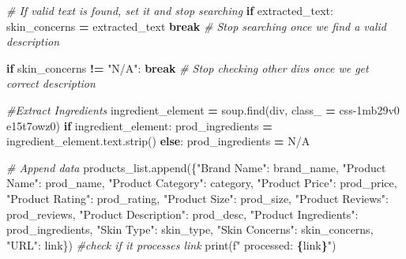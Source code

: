 \documentclass[
]{article}
\newenvironment{Shaded}{\begin{snugshade}}{\end{snugshade}}
\newcommand{\BuiltInTok}[1]{#1}
\newcommand{\CommentTok}[1]{\textcolor[rgb]{0.56,0.35,0.01}{\textit{#1}}}
\newcommand{\ControlFlowTok}[1]{\textcolor[rgb]{0.13,0.29,0.53}{\textbf{#1}}}
\newcommand{\NormalTok}[1]{#1}
\newcommand{\OperatorTok}[1]{\textcolor[rgb]{0.81,0.36,0.00}{\textbf{#1}}}
\newcommand{\SpecialCharTok}[1]{\textcolor[rgb]{0.81,0.36,0.00}{\textbf{#1}}}
\newcommand{\SpecialStringTok}[1]{\textcolor[rgb]{0.31,0.60,0.02}{#1}}
\newcommand{\StringTok}[1]{\textcolor[rgb]{0.31,0.60,0.02}{#1}}
\begin{document}
\begin{Shaded}
\begin{Highlighting}[]
                \CommentTok{\# If valid text is found, set it and stop searching}
                \ControlFlowTok{if}\NormalTok{ extracted\_text:}
\NormalTok{                  skin\_concerns }\OperatorTok{=}\NormalTok{ extracted\_text}
                  \ControlFlowTok{break} \CommentTok{\# Stop searching once we find a valid description}

            \ControlFlowTok{if}\NormalTok{ skin\_concerns }\OperatorTok{!=} \StringTok{"N/A"}\NormalTok{:}
              \ControlFlowTok{break}  \CommentTok{\# Stop checking other divs once we get correct description}
            
        \CommentTok{\#Extract Ingredients}
\NormalTok{        ingredient\_element }\OperatorTok{=}\NormalTok{ soup.find(}\StringTok{\textquotesingle{}div\textquotesingle{}}\NormalTok{, }
\NormalTok{        class\_ }\OperatorTok{=} \StringTok{\textquotesingle{}css{-}1mb29v0 e15t7owz0\textquotesingle{}}\NormalTok{)}
        \ControlFlowTok{if}\NormalTok{ ingredient\_element:}
\NormalTok{          prod\_ingredients }\OperatorTok{=}\NormalTok{ ingredient\_element.text.strip()}
        \ControlFlowTok{else}\NormalTok{:}
\NormalTok{          prod\_ingredients }\OperatorTok{=} \StringTok{\textquotesingle{}N/A\textquotesingle{}}
  
        \CommentTok{\# Append data}
\NormalTok{        products\_list.append(\{}\StringTok{"Brand Name"}\NormalTok{: brand\_name,}
                              \StringTok{"Product Name"}\NormalTok{: prod\_name,}
                              \StringTok{"Product Category"}\NormalTok{: category,}
                              \StringTok{"Product Price"}\NormalTok{: prod\_price,}
                              \StringTok{"Product Rating"}\NormalTok{: prod\_rating,}
                              \StringTok{"Product Size"}\NormalTok{: prod\_size,}
                              \StringTok{"Product Reviews"}\NormalTok{: prod\_reviews,}
                              \StringTok{"Product Description"}\NormalTok{: prod\_desc,}
                              \StringTok{"Product Ingredients"}\NormalTok{: prod\_ingredients,}
                              \StringTok{"Skin Type"}\NormalTok{: skin\_type,}
                              \StringTok{"Skin Concerns"}\NormalTok{: skin\_concerns,}
                              \StringTok{"URL"}\NormalTok{: link\})}
        \CommentTok{\#check if it processes link }
        \BuiltInTok{print}\NormalTok{(}\SpecialStringTok{f" processed: }\SpecialCharTok{\{}\NormalTok{link}\SpecialCharTok{\}}\SpecialStringTok{"}\NormalTok{)}


\end{Highlighting}
\end{Shaded}
\end{document}
